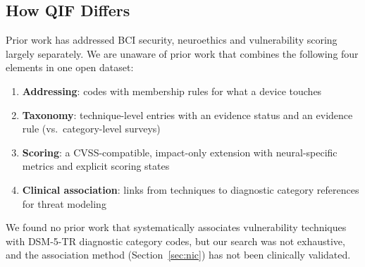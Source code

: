 \subsection{How QIF Differs}

Prior work has addressed BCI security, neuroethics and vulnerability scoring largely
separately. We are unaware of prior work that combines the following four elements in one
open dataset:

\begin{enumerate}
  \item \textbf{Addressing}: codes with membership rules for what a device touches
  \item \textbf{Taxonomy}: technique-level entries with an evidence status and an
        evidence rule (vs.\ category-level surveys)
  \item \textbf{Scoring}: a CVSS-compatible, impact-only extension with neural-specific
        metrics and explicit scoring states
  \item \textbf{Clinical association}: links from techniques to diagnostic category
        references for threat modeling
\end{enumerate}

We found no prior work that systematically associates vulnerability techniques with
DSM-5-TR diagnostic category codes, but our search was not exhaustive, and the
association method (Section~\ref{sec:nic}) has not been clinically validated.
